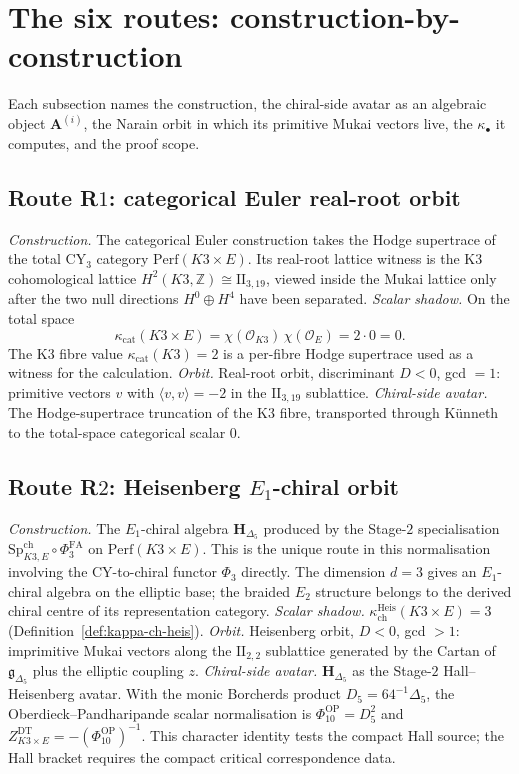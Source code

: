 \documentclass[11pt]{article}
\begin{document}
\section{The six routes: construction-by-construction}
\label{sec:six-routes}

Each subsection names the construction, the chiral-side avatar as an
algebraic object $\mathbf A^{(i)}$, the Narain orbit in which its
primitive Mukai vectors live, the $\kappa_\bullet$ it computes, and
the proof scope.

\subsection{Route R$1$: categorical Euler real-root orbit}
\label{subsec:R1-mukai}

\emph{Construction.} The categorical Euler construction takes the
Hodge supertrace of the total CY$_3$ category
$\mathrm{Perf}(K3\times E)$. Its real-root lattice witness is the
K3 cohomological lattice $H^2(K3,\mathbb Z)\cong \mathrm{II}_{3,19}$,
viewed inside the Mukai lattice only after the two null directions
$H^0\oplus H^4$ have been separated.
\emph{Scalar shadow.} On the total space
\[
\kappa_{\mathrm{cat}}(K3\times E)
=\chi(\mathcal O_{K3})\,\chi(\mathcal O_E)
=2\cdot 0=0.
\]
The K3 fibre value $\kappa_{\mathrm{cat}}(K3)=2$ is a per-fibre
Hodge supertrace used as a witness for the calculation.
\emph{Orbit.} Real-root orbit, discriminant $D < 0$, gcd $=1$:
primitive vectors $v$ with $\langle v, v \rangle = -2$ in the
$\mathrm{II}_{3,19}$ sublattice.
\emph{Chiral-side avatar.} The Hodge-supertrace truncation of the
K3 fibre, transported through K\"unneth to the total-space
categorical scalar $0$.

\subsection{Route R$2$: Heisenberg $E_1$-chiral orbit}
\label{subsec:R2-heis}

\emph{Construction.} The $E_1$-chiral algebra
$\mathbf H_{\Delta_5}$ produced by the Stage-$2$ specialisation
$\mathrm{Sp}^{\mathrm{ch}}_{K3,E}\circ \Phi^{\mathrm{FA}}_3$ on
$\mathrm{Perf}(K3 \times E)$. This is the unique route in this
normalisation involving the CY-to-chiral functor $\Phi_3$ directly.
The dimension $d = 3$ gives an $E_1$-chiral algebra on the elliptic
base; the braided $E_2$ structure belongs to the derived chiral centre
of its representation category.
\emph{Scalar shadow.}
$\kappa_{\mathrm{ch}}^{\mathrm{Heis}}(K3 \times E) = 3$
(Definition~\ref{def:kappa-ch-heis}).
\emph{Orbit.} Heisenberg orbit, $D < 0$, gcd $>1$: imprimitive
Mukai vectors along the $\mathrm{II}_{2,2}$ sublattice generated
by the Cartan of $\mathfrak g_{\Delta_5}$ plus the elliptic
coupling $z$.
\emph{Chiral-side avatar.}
$\mathbf H_{\Delta_5}$ as the Stage-$2$ Hall--Heisenberg avatar.
With the monic Borcherds product $D_5=64^{-1}\Delta_5$, the
Oberdieck--Pandharipande scalar normalisation is
$\Phi_{10}^{\mathrm{OP}}=D_5^2$ and
$Z_{K3\times E}^{\mathrm{DT}}=-(\Phi_{10}^{\mathrm{OP}})^{-1}$.
This character identity tests the compact Hall source; the Hall
bracket requires the compact critical correspondence data.
\end{document}

